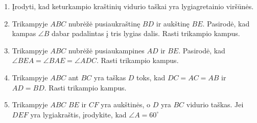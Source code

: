 \begin{enumerate} 
  \item Įrodyti, kad keturkampio kraštinių vidurio taškai yra lygiagretainio
    viršūnės.
  \item Trikampyje $ABC$ nubrėžė pusiaukraštinę $BD$ ir aukštinę $BE$.
    Pasirodė, kad kampas $\angle B$ dabar padalintas į tris lygias dalis.
    Rasti trikampio kampus.
  \item Trikampyje $ABC$ nubrėžė pusiaukampines $AD$ ir $BE$. Pasirodė, 
    kad $\angle BEA=\angle BAE=\angle ADC$. Rasti trikampio kampus.
  \item Trikampyje $ABC$ ant $BC$ yra taškas $D$ toks, kad $DC=AC=AB$ ir $AD=BD$.
    Rasti trikampio kampus.
  \item Trikampyje $ABC$ $BE$ ir $CF$ yra aukštinės, o $D$ yra $BC$ vidurio
    taškas. Jei $DEF$ yra lygiakraštis, įrodykite, kad $\angle A=60^\circ$

\end{enumerate}
